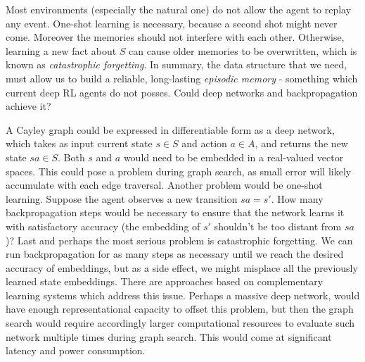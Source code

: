 \documentclass[oneside,english,logo]{amuthesis}
\begin{document}
Most environments (especially the natural one) do not allow the agent to replay any event. One-shot learning is necessary, because a second shot might never come.  Moreover the memories should not interfere with each other. Otherwise, learning a new fact about $S$ can cause older memories to be overwritten, which is known as \textit{catastrophic forgetting}. In summary, the data structure that we need, must allow us to build a reliable, long-lasting \textit{episodic memory} - something which current deep RL agents do not posses. Could deep networks and backpropagation achieve it? 

A Cayley graph could be expressed in differentiable form as a deep network, which takes as input current state $s\in S$ and action $a\in A$, and returns the new state $sa\in S$.  Both $s$ and $a$ would need to be embedded in a real-valued vector spaces. This could pose a problem during graph search, as small error will likely accumulate with each edge traversal. Another problem would be one-shot learning. Suppose the agent observes a new transition $sa=s'$. How many backpropagation steps would be necessary to ensure that the network learns it with satisfactory accuracy (the embedding of $s'$ shouldn't be too distant from $sa$)? Last and perhaps the most serious problem is catastrophic forgetting. We can run backpropagation for as many steps as necessary until we reach the desired accuracy of embeddings, but as a side effect, we might misplace all the previously learned state embeddings. There are approaches based on complementary learning systems\cite{BLAKEMAN2020218} which address this issue. Perhaps a massive deep network, would have enough representational capacity to offset this problem, but then the graph search would require accordingly larger computational resources to evaluate such network multiple times during graph search. This would come at significant latency and power consumption. 
\end{document}
